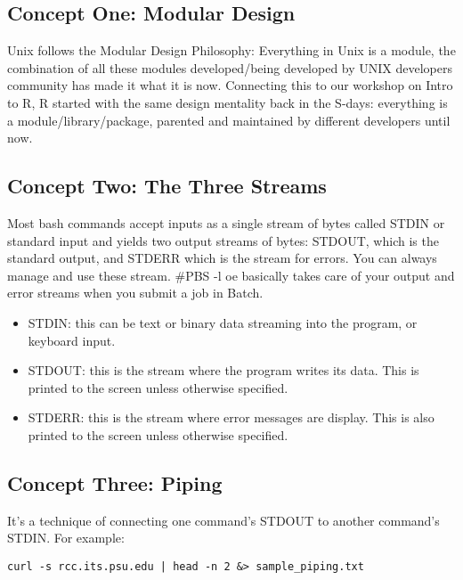 \documentclass[12pt]{article}
\begin{document}
\subsection{Concept One: Modular Design} 
Unix follows the Modular Design Philosophy:
Everything in Unix is a module, the combination of all these modules developed/being developed by UNIX developers community has made it what it is now. Connecting this to our workshop on Intro to R, R started with the same design mentality back in the S-days: everything is a module/library/package, parented and maintained by different developers until now.
 
\subsection{Concept Two: The Three Streams}
Most bash commands accept inputs as a single stream of bytes called STDIN or standard input
and yields two output streams of bytes: STDOUT, which is the standard output, and STDERR
which is the stream for errors. You can always manage and use these stream. $\#$PBS -l oe basically takes care of your output and error streams when you submit a job in Batch. 
\begin{itemize}

\item STDIN: this can be text or binary data streaming into the program, or keyboard input.

\item STDOUT: this is the stream where the program writes its data. This is printed to the
screen unless otherwise specified.
\item STDERR: this is the stream where error messages are display. This is also printed to the
screen unless otherwise specified.
\end{itemize}

\subsection{Concept Three: Piping}
It's a technique of connecting one command's STDOUT to another command's STDIN.
For example:\\

\begin{lstlisting}[label= piping,caption= piping]
curl -s rcc.its.psu.edu | head -n 2 &> sample_piping.txt
\end{lstlisting}
\end{document}
